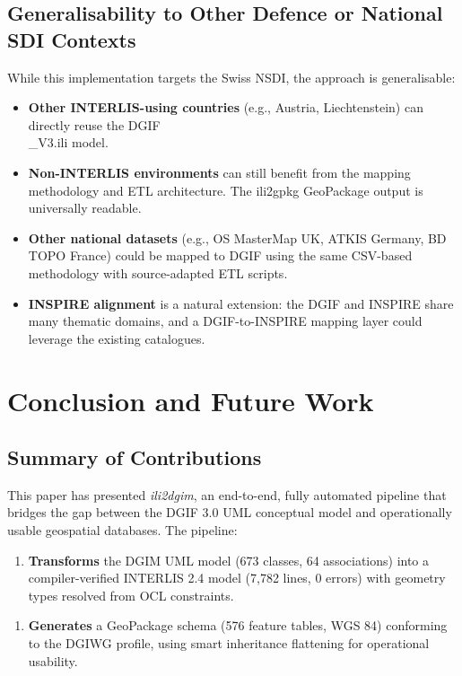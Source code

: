 \documentclass[conference]{IEEEtran}
\begin{document}
\subsection{Generalisability to Other Defence or National SDI Contexts}

While this implementation targets the Swiss NSDI, the approach is generalisable:

\begin{itemize}[leftmargin=*]
\item \textbf{Other INTERLIS-using countries} (e.g., Austria, Liechtenstein) can directly reuse the DGIF\\_V3.ili model.
\item \textbf{Non-INTERLIS environments} can still benefit from the mapping methodology and ETL architecture. The ili2gpkg GeoPackage output is universally readable.
\item \textbf{Other national datasets} (e.g., OS MasterMap UK, ATKIS Germany, BD TOPO France) could be mapped to DGIF using the same CSV-based methodology with source-adapted ETL scripts.
\item \textbf{INSPIRE alignment} is a natural extension: the DGIF and INSPIRE share many thematic domains, and a DGIF-to-INSPIRE mapping layer could leverage the existing catalogues.
\end{itemize}



\section{Conclusion and Future Work}

\subsection{Summary of Contributions}

This paper has presented \textit{ili2dgim}, an end-to-end, fully automated pipeline that bridges the gap between the DGIF 3.0 UML conceptual model and operationally usable geospatial databases. The pipeline:

\begin{enumerate}[leftmargin=*]
\item \textbf{Transforms} the DGIM UML model (673 classes, 64 associations) into a compiler-verified INTERLIS 2.4 model (7,782 lines, 0 errors) with geometry types resolved from OCL constraints.
\end{enumerate}

\begin{enumerate}[leftmargin=*]
\item \textbf{Generates} a GeoPackage schema (576 feature tables, WGS 84) conforming to the DGIWG profile, using smart inheritance flattening for operational usability.
\end{enumerate}
\end{document}
